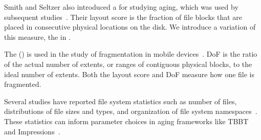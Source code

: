 Smith and Seltzer also introduced a  for studying aging,
which was used by subsequent studies~\cite{ahn02mascots,AgrawalArAr09}. Their
layout score is the fraction of file blocks that are placed in consecutive
physical locations on the disk. We introduce a variation of this measure, the
 in .


The  () is used in the study of
fragmentation in mobile devices~\cite{JiChSh16}. DoF is the ratio of the actual
number of extents, or ranges of contiguous physical blocks, to the ideal number
of extents.  Both the layout score and DoF measure how one file is fragmented.

\iffalse
\fixme{BILL: do any
  fragmentation tools report layout scores?  e2fsprogs?}\fixmeac{I
  checked the man pages quickly for e2fsprogs, and I don't think they
  do}\fixme{Yang: Just to mention it contains tools for reporting file
  fragmentation, so one can probably calculate from there. Another
  thing, there is one paper "The Effects of Filesystem Fragmentation"
  describing some theoretic fragmentation but mainly on video files
  (so they are big)}
\fi

Several studies have reported file system statistics
such as number of files, distributions of
file sizes and types, and organization of file system
namespaces~\cite{AgrawalBoDo07,Downey01,RoselliLoAn01}.
These statistics can inform parameter choices in aging frameworks like TBBT and Impressions~\cite{ZhuChCh05,AgrawalArAr09}.



